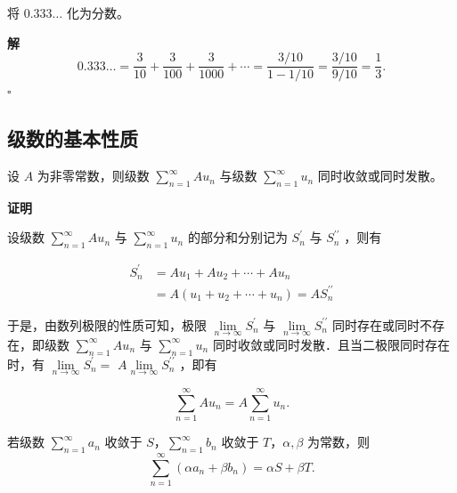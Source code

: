 \documentclass[fontset=fandol]{ctexart}
\newenvironment{custom}[1]{\par\noindent\textbf{#1}\quad}{\par\vspace{0.8em}}
\newenvironment{solution}{\par\noindent\textbf{解}\quad}{\hfill$\square$\par\vspace{0.8em}}
\begin{document}
\begin{example}[应用：循环小数化分数]
将 \(0.333\ldots\) 化为分数。
\end{example}
\begin{solution}
\[
0.333\ldots = \dfrac{3}{10} + \dfrac{3}{100} + \dfrac{3}{1000} + \cdots = \dfrac{3/10}{1-1/10} = \dfrac{3/10}{9/10} = \dfrac{1}{3}.
\]
\end{solution}

\subsection{级数的基本性质}


\begin{property}
	设 $A$ 为非零常数，则级数 $\sum\limits_{n = 1}^{  \infty } A u_n$ 与级数 $\sum\limits_{n = 1}^{  \infty } u_n$ 同时收敛或同时发散。
\end{property}

\begin{custom}{证明}

设级数 $\sum\limits_{n = 1}^{  \infty } A u_n$ 与 $\sum\limits_{n = 1}^{  \infty } u_n$ 的部分和分别记为 $S_n^{\prime}$ 与 $S_n^{\prime \prime}$ ，则有

$$
\begin{aligned}
	S_n^{\prime} & =A u_1+A u_2+\cdots+A u_n \\
	& =A\left(u_1+u_2+\cdots+u_n\right)=A S_n^{\prime \prime}
\end{aligned}
$$

于是，由数列极限的性质可知，极限 $\lim \limits_{n \to \infty} S_n^{\prime}$ 与 $\lim \limits_{n \to \infty} S_n^{\prime \prime}$ 同时存在或同时不存在，即级数 $\sum\limits_{n = 1}^{  \infty } A u_n$ 与 $\sum\limits_{n = 1}^{  \infty } u_n$ 同时收敛或同时发散．且当二极限同时存在时，有 $\lim \limits_{n \to \infty} S_n^{\prime}=$ $A \lim \limits_{n \to \infty} S_n^{\prime \prime}$ ，即有

$$
\sum_{n=1}^{\infty} A u_n=A \sum_{n=1}^{\infty} u_n .
$$

\end{custom}

\begin{property}[级数的线性性质]
	
	
	
若级数 \(\sum\limits_{n = 1}^{  \infty } a_n\) 收敛于 \(S\)，\(\sum\limits_{n = 1}^{  \infty } b_n\) 收敛于 \(T\)，\(\alpha, \beta\) 为常数，则
\[
\sum_{n=1}^{\infty} (\alpha a_n + \beta b_n) = \alpha S + \beta T.
\]
\end{property}
\end{document}
